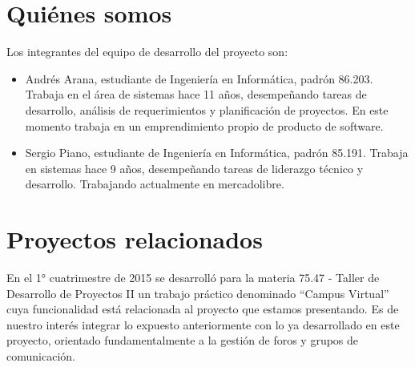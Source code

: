 \documentclass[a4paper,11pt]{article}
\begin{document}
\section*{{\Large{}Quiénes somos}}

\leftskip=0pt
\parindent=0pt
Los integrantes del equipo de desarrollo del proyecto son:

\leftskip=36pt
\parindent=-18pt
\begin{itemize}
    \item Andrés Arana, estudiante de Ingeniería en Informática, padrón 86.203. 
    Trabaja en el área de sistemas hace 11 años, desempeñando tareas de desarrollo, 
    análisis de requerimientos y planificación de proyectos. En este momento trabaja 
    en un emprendimiento propio de producto de software.

    \item Sergio Piano, estudiante de Ingeniería en Informática, padrón 85.191. 
    Trabaja en sistemas hace 9 años, desempeñando tareas de liderazgo técnico y 
    desarrollo. Trabajando actualmente en mercadolibre.
\end{itemize}

\vspace{10pt}
\section*{{\Large{}Proyectos relacionados}}

\leftskip=0pt
\parindent=0pt
En el 1° cuatrimestre de 2015 se desarrolló para la materia 75.47 - Taller de 
Desarrollo de Proyectos II un trabajo práctico denominado ``Campus Virtual'' cuya 
funcionalidad está relacionada al proyecto que estamos presentando. Es de nuestro 
interés integrar lo expuesto anteriormente con lo ya desarrollado en este proyecto, 
orientado fundamentalmente a la gestión de foros y grupos de comunicación.

\newpage
\end{document}
